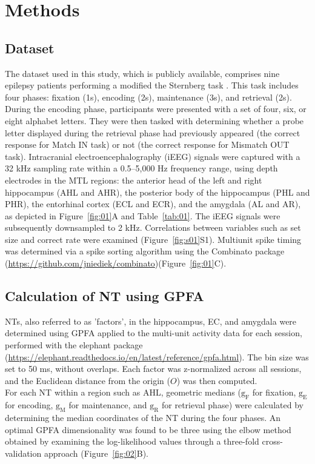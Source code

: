 \documentclass[preprint,review,12pt]{elsarticle}%
\begin{document}
\section{Methods}
\subsection{Dataset}
The dataset used in this study, which is publicly available, comprises nine epilepsy patients performing a modified the Sternberg task \cite{boran_dataset_2020}. This task includes four phases: fixation (1s), encoding (2s), maintenance (3s), and retrieval (2s). During the encoding phase, participants were presented with a set of four, six, or eight alphabet letters. They were then tasked with determining whether a probe letter displayed during the retrieval phase had previously appeared (the correct response for Match IN task) or not (the correct response for Mismatch OUT task). Intracranial electroencephalography (iEEG) signals were captured with a 32 kHz sampling rate within a 0.5--5,000 Hz frequency range, using depth electrodes in the MTL regions: the anterior head of the left and right hippocampus (AHL and AHR), the posterior body of the hippocampus (PHL and PHR), the entorhinal cortex (ECL and ECR), and the amygdala (AL and AR), as depicted in Figure~\ref{fig:01}A and Table~\ref{tab:01}. The iEEG signals were subsequently downsampled to 2 kHz. Correlations between variables such as set size and correct rate were examined (Figure~\ref{fig:s01}S1). Multiunit spike timing was determined via a spike sorting algorithm \cite{niediek_reliable_2016} using the Combinato package (\url{https://github.com/jniediek/combinato})(Figure~\ref{fig:01}C).

\subsection{Calculation of NT using GPFA}
NTs, also referred to as 'factors', in the hippocampus, EC, and amygdala were determined using GPFA \cite{yu_gaussian-process_2009} applied to the multi-unit activity data for each session, performed with the elephant package (\url{https://elephant.readthedocs.io/en/latest/reference/gpfa.html}). The bin size was set to 50 ms, without overlaps. Each factor was z-normalized across all sessions, and the Euclidean distance from the origin ($O$) was then computed.
\\
\indent
For each NT within a region such as AHL, geometric medians ($\mathrm{g_{F}}$ for fixation, $\mathrm{g_{E}}$ for encoding, $\mathrm{g_{M}}$ for maintenance, and $\mathrm{g_{R}}$ for retrieval phase) were calculated by determining the median coordinates of the NT during the four phases. An optimal GPFA dimensionality was found to be three using the elbow method obtained by examining the log-likelihood values through a three-fold cross-validation approach (Figure~\ref{fig:02}B).
\end{document}
